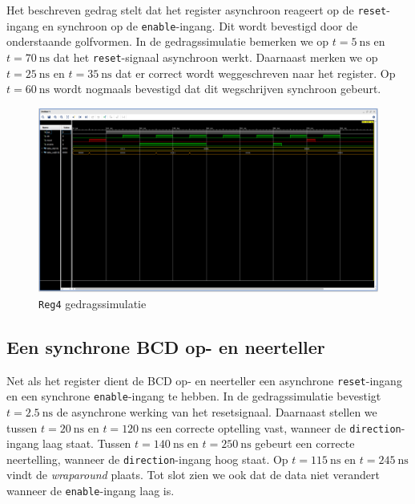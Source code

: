 \documentclass[titlepage]{article}
\begin{document}
Het beschreven gedrag stelt dat het register asynchroon reageert op de \texttt{reset}-ingang en synchroon op de \texttt{enable}-ingang.
Dit wordt bevestigd door de onderstaande golfvormen.
In de gedragssimulatie bemerken we op \( t = \SI{5}{\nano\second} \) en \( t = \SI{70}{\nano\second} \) dat het \texttt{reset}-signaal asynchroon werkt.
Daarnaast merken we op \( t = \SI{25}{\nano\second} \) en \( t =\SI{35}{\nano\second} \) dat er correct wordt weggeschreven naar het register.
Op \( t = \SI{60}{\nano\second} \) wordt nogmaals bevestigd dat dit wegschrijven synchroon gebeurt.

\begin{figure}[h!]
    \centering
    \includegraphics[trim={0 500px 0 0}, clip, width=0.8\linewidth]{Reg4_gedragssimulatie.PNG}
    \caption{\texttt{Reg4} gedragssimulatie}
    \label{fig:Reg4_gedragssimulatie}
\end{figure}

\clearpage

\subsection{Een synchrone BCD op- en neerteller}

Net als het register dient de BCD op- en neerteller een asynchrone \texttt{reset}-ingang en een synchrone \texttt{enable}-ingang te hebben.
In de gedragssimulatie bevestigt \( t = \SI{2.5}{\nano\second} \) de asynchrone werking van het resetsignaal.
Daarnaast stellen we tussen \( t = \SI{20}{\nano\second} \) en \( t = \SI{120}{\nano\second} \) een correcte optelling vast, wanneer de \texttt{direction}-ingang laag staat.
Tussen \( t = \SI{140}{\nano\second} \) en \( t = \SI{250}{\nano\second} \) gebeurt een correcte neertelling, wanneer de \texttt{direction}-ingang hoog staat.
Op \( t = \SI{115}{\nano\second} \) en \( t = \SI{245}{\nano\second} \) vindt de \textit{wraparound} plaats.
Tot slot zien we ook dat de data niet verandert wanneer de \texttt{enable}-ingang laag is.
\end{document}
